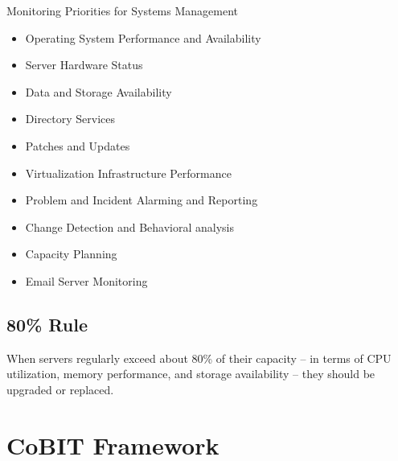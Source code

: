 \documentclass[8pt,a4]{extarticle}
\begin{document}
\begin{multicols}{3}
Monitoring Priorities for Systems Management
\begin{itemize}
    \item Operating System Performance and Availability
    \item Server Hardware Status
    \item Data and Storage Availability
    \item Directory Services
    \item Patches and Updates
    \item Virtualization Infrastructure Performance
    \item Problem and Incident Alarming and Reporting
    \item Change Detection and Behavioral analysis
    \item Capacity Planning
    \item Email Server Monitoring
\end{itemize}

\subsection{80\% Rule}
When servers regularly exceed about 80\% of their capacity – in terms of CPU utilization, memory performance, 
and storage availability – they should be upgraded or replaced. 

\section{CoBIT Framework}

\end{multicols}
\end{document}

